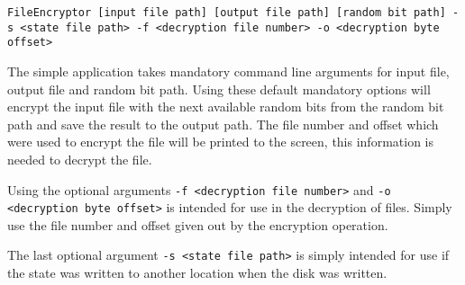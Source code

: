 \documentclass{paper}
\begin{document}
				\texttt{FileEncryptor [input file path] [output file path] [random bit path] -s <state file path> -f <decryption file number> -o <decryption byte offset>}
				
				The simple application takes mandatory command line arguments for input file, output file and random bit path. Using these default mandatory options will encrypt the input file with the next available random bits from the random bit path and save the result to the output path. The file number and offset which were used to encrypt the file will be printed to the screen, this information is needed to decrypt the file.
				
				Using the optional arguments \texttt{-f <decryption file number>} and \texttt{-o <decryption byte offset>} is intended for use in the decryption of files. Simply use the file number and offset given out by the encryption operation. 
				
				The last optional argument \texttt{-s <state file path>} is simply intended for use if the state was written to another location when the disk was written.
		
						
\end{document}
